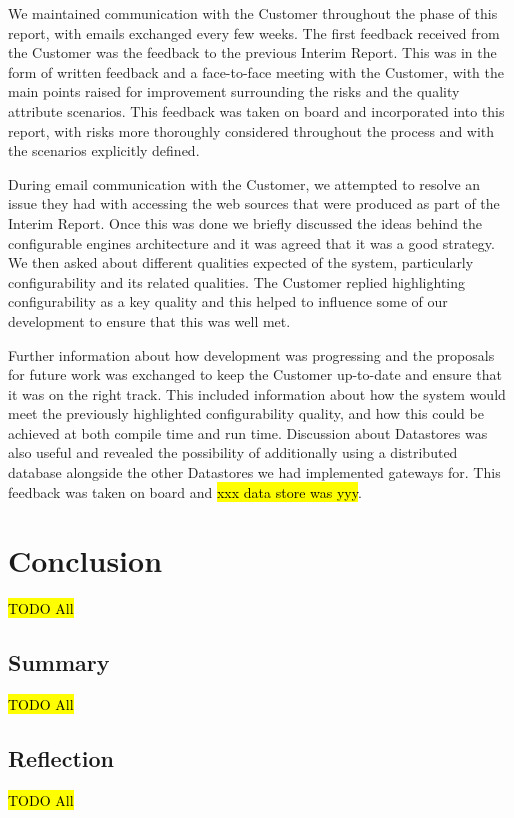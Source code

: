 \documentclass[10pt,a4paper]{article}
\begin{document}
We maintained communication with the Customer throughout the phase of this report, with emails exchanged every few weeks. The first feedback received from the Customer was the feedback to the previous Interim Report. This was in the form of written feedback and a face-to-face meeting with the Customer, with the main points raised for improvement surrounding the risks and the quality attribute scenarios. This feedback was taken on board and incorporated into this report, with risks more thoroughly considered throughout the process and with the scenarios explicitly defined.

During email communication with the Customer, we attempted to resolve an issue they had with accessing the web sources that were produced as part of the Interim Report. Once this was done we briefly discussed the ideas behind the configurable engines architecture and it was agreed that it was a good strategy. We then asked about different qualities expected of the system, particularly configurability and its related qualities. The Customer replied highlighting configurability as a key quality and this helped to influence some of our development to ensure that this was well met.

Further information about how development was progressing and the proposals for future work was exchanged to keep the Customer up-to-date and ensure that it was on the right track. This included information about how the system would meet the previously highlighted configurability quality, and how this could be achieved at both compile time and run time. Discussion about Datastores was also useful and revealed the possibility of additionally using a distributed database alongside the other Datastores we had implemented gateways for. This feedback was taken on board and \hl{xxx data store was yyy}.


\section{Conclusion}
\label{sec:conclusion}
\hl{TODO All}

\subsection{Summary}
\label{sec:summary}
\hl{TODO All}

\subsection{Reflection}
\label{sec:reflection}
\hl{TODO All}



\end{document}

